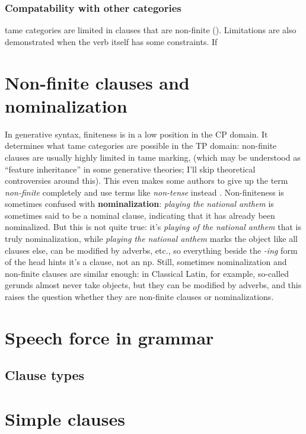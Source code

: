 \documentclass[UTF8, a4paper, oneside, scheme=plain]{ctexart}
\newcommand*{\citesec}[1]{\S~{#1}}
\newcommand*{\concept}[1]{\textbf{#1}}
\newcommand*{\term}[1]{\emph{#1}}
\newcommand*{\corpus}[1]{\emph{#1}}
\begin{document}
\subsubsection{Compatability with other categories}

\ac{tame} categories are limited in clauses 
that are non-finite ().
Limitations are also demonstrated when the verb itself has some constraints.
If 

\section{Non-finite clauses and nominalization}\label{sec:non-finite}

In generative syntax, finiteness is in a low position in the CP domain.
It determines what \ac{tame} categories are possible in the TP domain:
non-finite clauses are usually highly limited in \ac{tame} marking,
(which may be understood as ``feature inheritance'' in some generative theories; 
I'll skip theoretical controversies around this).
This even makes some authors to give up the term \term{non-finite} completely 
and use terms like \term{non-tense} instead \citep[\citesec{2.2.1}]{dixon2005semantic}.
Non-finiteness is sometimes confused with \concept{nominalization}:
\corpus{playing the national anthem} is sometimes said to be a nominal clause,
indicating that it has already been nominalized.
But this is not quite true:
it's \corpus{playing of the national anthem} that is truly nominalization,
while \corpus{playing the national anthem} marks the object like all clauses else,
can be modified by adverbs, etc.,
so everything beside the \corpus{-ing} form of the head hints it's a clause, not an \ac{np}.
Still, sometimes nominalization and non-finite clauses are similar enough:
in Classical Latin, for example,
so-called gerunds almost never take objects,
but they can be modified by adverbs,
and this raises the question whether they are non-finite clauses or nominalizations.

\section{Speech force in grammar}

\subsection{Clause types}

\section{Simple clauses}
\end{document}
